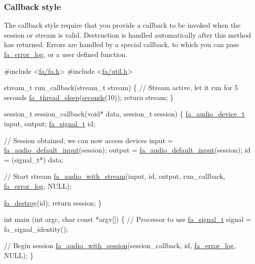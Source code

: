 \hypertarget{md__devices_AudioCB}{}\subsubsection{Callback style}\label{md__devices_AudioCB}
The callback style require that you provide a callback to be invoked when the session or stream is valid. Destruction is handled automatically after this method has returned. Errors are handled by a special callback, to which you can pass \hyperlink{group___fa_error_ga466e0539bedb29f68527448ed9ba11bf}{fa\-\_\-error\-\_\-log}, or a user defined function.


\begin{DoxyCode}
\textcolor{preprocessor}{#include <\hyperlink{fa_2fa_8h}{fa/fa.h}>}
\textcolor{preprocessor}{#include <\hyperlink{util_8h}{fa/util.h}>}

stream\_t run\_callback(stream\_t stream)
\{
    \textcolor{comment}{// Stream active, let it run for 5 seconds}
    \hyperlink{group___fa_thread_ga6a6c70317be48603d0316bdb93914f5f}{fa\_thread\_sleep}(\hyperlink{util_8h_a1a3cd4cff330c981ed89bbd3a3426273}{seconds}(10));
    \textcolor{keywordflow}{return} stream;
\}

session\_t session\_callback(\textcolor{keywordtype}{void}* data, session\_t session)
\{
    \hyperlink{group___fa_audio_device_ga03de89ee66c6465f8cedd3a0286598f4}{fa\_audio\_device\_t}    input, output;
    \hyperlink{group___fa_signal_gac5c72f160cd6e93a6783551627b166e5}{fa\_signal\_t}          id;

    \textcolor{comment}{// Session obtained, we can now access devices}
    input   = \hyperlink{group___fa_audio_device_ga690374b4ffcee314cb4cdad6309ef817}{fa\_audio\_default\_input}(session);
    output  = \hyperlink{group___fa_audio_device_ga690374b4ffcee314cb4cdad6309ef817}{fa\_audio\_default\_input}(session);
    \textcolor{keywordtype}{id}      = (signal\_t*) data;

    \textcolor{comment}{// Start stream}
    \hyperlink{group___fa_audio_stream_gaa385a92b31401915477027e03a39094e}{fa\_audio\_with\_stream}(input, \textcolor{keywordtype}{id}, output,
                          run\_callback, \hyperlink{group___fa_error_ga466e0539bedb29f68527448ed9ba11bf}{fa\_error\_log}, NULL);

    \hyperlink{group___fa_ga6fd6818b190b9e41a3b5f07e78638539}{fa\_destroy}(\textcolor{keywordtype}{id});
    \textcolor{keywordflow}{return} session;
\}

\textcolor{keywordtype}{int} main (\textcolor{keywordtype}{int} argc, \textcolor{keywordtype}{char} \textcolor{keyword}{const} *argv[])
\{                  
    \textcolor{comment}{// Processor to use}
    \hyperlink{group___fa_signal_gac5c72f160cd6e93a6783551627b166e5}{fa\_signal\_t} signal = fa\_signal\_identity();

    \textcolor{comment}{// Begin session}
    \hyperlink{group___fa_audio_session_gabbec6678e24f6476ac04f7d759ec7ffb}{fa\_audio\_with\_session}(session\_callback, \textcolor{keywordtype}{id},
                           \hyperlink{group___fa_error_ga466e0539bedb29f68527448ed9ba11bf}{fa\_error\_log}, NULL);
\}
\end{DoxyCode}
